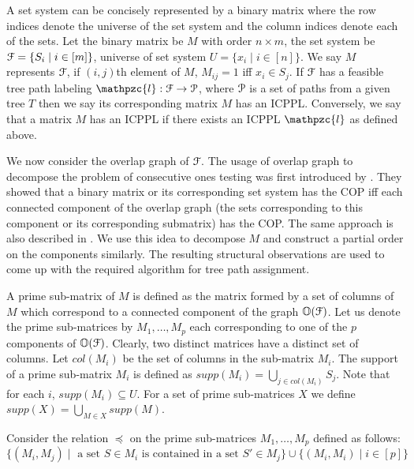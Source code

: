 \documentclass[a4paper,UKenglish,numberwithinsect]{lipics}
\def\cA{{\cal A}}
\def\cF{{\cal F}}
\def\cP{{\cal P}}
\def\bO{\mathbb O}
\def\cl{\mathpzc{l}}
\begin{document}
\noindent
A set system can be concisely represented by a binary matrix where the
row indices denote the universe of the set system and the column
indices denote each of the sets. Let the binary matrix be $M$ with
order $n \times m$, the set system be $\cF = \{S_i \mid i \in [m]\}$,
universe of set system $U = \{x_i \mid i \in [n]\}$. We say $M$ represents
$\cF$, if $(i,j)$th element of $M$, $M_{ij} =
1$ iff $x_i \in S_j$. If $\cF$ has a feasible tree path labeling $\cl:
\cF \rightarrow \cP$, where $\cP$ is a set of paths from a given tree
$T$
then we say its 
corresponding matrix $M$ has an ICPPL. 
Conversely, we say that a matrix
$M$ has an ICPPL if there exists an ICPPL $\cl$ as defined
above.

\noindent
We now consider the overlap graph of
$\cF$. The usage of overlap graph to
decompose the problem of consecutive ones testing was first introduced
by \cite{fg65}. They showed that a binary matrix or its corresponding
set system has the COP iff each connected component of the overlap
graph (the sets corresponding to this component or its corresponding
submatrix) has the COP. The same approach is also described in
\cite{wlh02,nsnrs09}. We use this idea to decompose $M$ and construct
a partial order on the components similarly. The resulting structural
observations are used to come up with the required algorithm for tree
path assignment. 

\noindent
A prime sub-matrix of $M$ is defined as the matrix formed by a set of
columns of $M$ which correspond to a connected component of the graph
$\bO(\cF)$.  Let us denote the prime sub-matrices by $M_1,\ldots,M_p$ each
corresponding to one of the $p$ components of $\bO(\cF)$. Clearly, two
distinct matrices have a distinct set of columns.  Let $col(M_i)$ be
the set of columns in the sub-matrix $M_i$.  The support of a prime
sub-matrix $M_i$ is defined as $supp(M_i) = \bigcup_{j
  \in col(M_i)}S_j$.  Note that for each $i$, $supp(M_i) \subseteq U$.
For a set of prime sub-matrices $X$ we define
$supp(X) = \bigcup_{M \in X} supp(M)$. 

\noindent
Consider the relation $\preccurlyeq$ on the prime sub-matrices $M_1,
\ldots, M_p$ defined as follows:
\begin{equation} 
\nonumber \{(M_i, M_j) \mid \text{ a set } S \in
  M_i \text{ is contained in a set } S' \in M_j\} \cup \{(M_i,M_i) \mid i \in[p]\} 
\end{equation}
\end{document}
